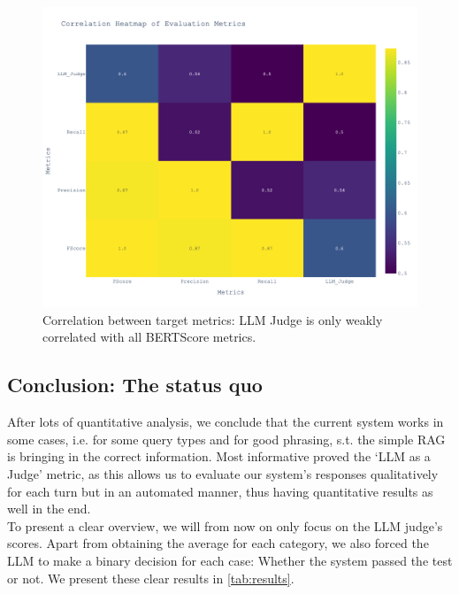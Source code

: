 \documentclass{article}
\begin{document}
\begin{figure}[htb]
    \centering
    \includegraphics[width=0.8\linewidth]{docs/phase2/plots/metric_correlation_heatmap.png}
    \caption{Correlation between target metrics: LLM Judge is only weakly correlated with all BERTScore metrics.}
    \label{fig:heatmap}
\end{figure}

\subsection{Conclusion: The status quo}
\label{sec:summary}

After lots of quantitative analysis, we conclude that the current system works in some cases, i.e. for some query types and for good phrasing, s.t. the simple RAG is bringing in the correct information. Most informative proved the `LLM as a Judge' metric, as this allows us to evaluate our system's responses qualitatively for each turn but in an automated manner, thus having quantitative results as well in the end.\\

To present a clear overview, we will from now on only focus on the LLM judge's scores. Apart from obtaining the average for each category, we also forced the LLM to make a binary decision for each case: Whether the system passed the test or not. We present these clear results in \cref{tab:results}.\\
\end{document}
